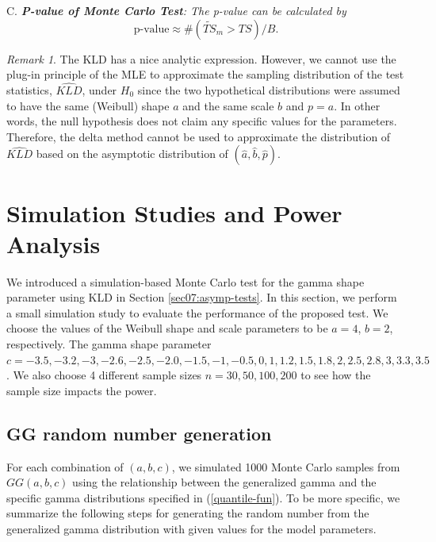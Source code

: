 \documentclass{ps}
\theoremstyle{plain}%
\theoremstyle{definition}
\theoremstyle{remark}
\newtheorem{remark}{Remark}
\begin{document}
\noindent C. \emph{{\bf P-value of Monte Carlo Test}: The p-value can be calculated by  
	\begin{equation}\label{MC-p-value}
		\mbox{p-value} \approx \#(\widetilde{TS}_m  > TS)/B.
	\end{equation}
}
\begin{remark}
	
	The KLD has a nice analytic expression. However, we cannot use the plug-in principle of the MLE to approximate the sampling distribution of the test statistics, $\widehat{KLD}$, under $H_0$ since the two hypothetical distributions were assumed to have the same (Weibull) shape $a$ and the same scale $b$ and $p = a$. In other words, the null hypothesis does not claim any specific values for the parameters. Therefore, the delta method cannot be used to approximate the distribution of $\widehat{KLD}$ based on the asymptotic distribution of $(\hat{a}, \hat{b}, \hat{p})$.
	
\end{remark}



\section{Simulation Studies and Power Analysis}\label{sec08:Simulation}

We introduced a simulation-based Monte Carlo test for the gamma shape parameter using KLD in Section \ref{sec07:asymp-tests}. In this section, we perform a small simulation study to evaluate the performance of the proposed test.  We choose the values of the Weibull shape and scale parameters to be $a = 4$, $b = 2$, respectively. The gamma shape parameter  $c = -3.5, -3.2, -3, -2.6, -2.5, -2.0, -1.5, -1, -0.5, 0, 1, 1.2, 1.5, 1.8, 2, 2.5, 2.8, 3, 3.3, 3.5$. We also choose 4 different sample sizes $n = 30, 50, 100, 200$ to see how the sample size impacts the power. 

\subsection{GG random number generation}\label{random-generation}

For each combination of $(a, b, c)$, we simulated 1000 Monte Carlo samples from $GG(a, b, c)$ using the relationship between the generalized gamma and the specific gamma distributions specified in (\ref{quantile-fun}).  To be more specific, we summarize the following steps for generating the random number from the generalized gamma distribution with given values for the model parameters.\\
\end{document}
